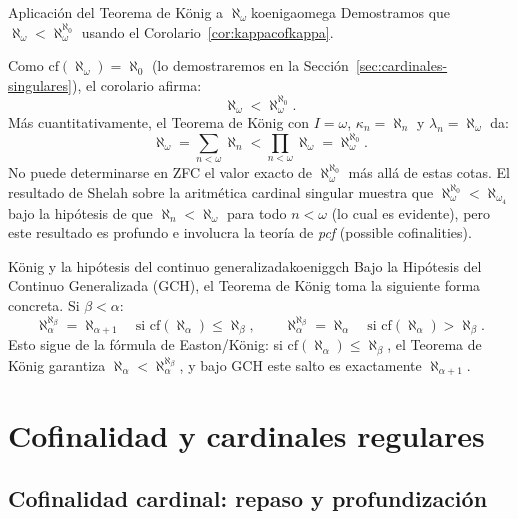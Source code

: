 \begin{ejemplo}{Aplicación del Teorema de König a $\aleph_\omega$}{koenigaomega}
Demostramos que $\aleph_\omega < \aleph_\omega^{\aleph_0}$ usando el Corolario~\ref{cor:kappacofkappa}.

Como $\mathrm{cf}(\aleph_\omega) = \aleph_0$ (lo demostraremos en la Sección~\ref{sec:cardinales-singulares}), el corolario afirma:
\[
  \aleph_\omega < \aleph_\omega^{\aleph_0}.
\]
Más cuantitativamente, el Teorema de König con $I = \omega$, $\kappa_n = \aleph_n$ y $\lambda_n = \aleph_\omega$ da:
\[
  \aleph_\omega = \sum_{n < \omega} \aleph_n < \prod_{n < \omega} \aleph_\omega = \aleph_\omega^{\aleph_0}.
\]
No puede determinarse en ZFC el valor exacto de $\aleph_\omega^{\aleph_0}$ más allá de estas cotas. El resultado de Shelah sobre la aritmética cardinal singular \cite{shelah1994} muestra que $\aleph_\omega^{\aleph_0} < \aleph_{\omega_4}$ bajo la hipótesis de que $\aleph_n < \aleph_\omega$ para todo $n < \omega$ (lo cual es evidente), pero este resultado es profundo e involucra la teoría de \emph{pcf} (possible cofinalities).
\end{ejemplo}

\begin{ejemplo}{König y la hipótesis del continuo generalizada}{koeniggch}
Bajo la Hipótesis del Continuo Generalizada (GCH), el Teorema de König toma la siguiente forma concreta. Si $\beta < \alpha$:
\[
  \aleph_\alpha^{\aleph_\beta} = \aleph_{\alpha+1}
  \quad \text{si } \mathrm{cf}(\aleph_\alpha) \leq \aleph_\beta,
  \qquad
  \aleph_\alpha^{\aleph_\beta} = \aleph_\alpha
  \quad \text{si } \mathrm{cf}(\aleph_\alpha) > \aleph_\beta.
\]
Esto sigue de la fórmula de Easton/König: si $\mathrm{cf}(\aleph_\alpha) \leq \aleph_\beta$, el Teorema de König garantiza $\aleph_\alpha < \aleph_\alpha^{\aleph_\beta}$, y bajo GCH este salto es exactamente $\aleph_{\alpha+1}$.
\end{ejemplo}

\section{Cofinalidad y cardinales regulares}
\label{sec:cofinalidad-regular}

\subsection{Cofinalidad cardinal: repaso y profundización}

